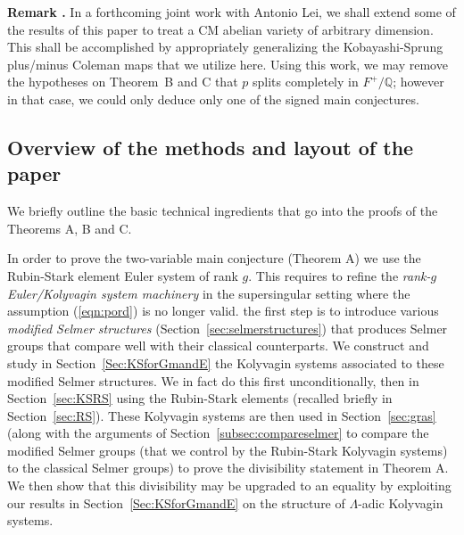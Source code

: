\documentclass[12pt]{amsart}
\numberwithin{equation}{section}
\newenvironment{rem}{\par\medskip\noindent\refstepcounter{thm}
\bgroup{\hspace*{-0.15 cm}\bf{Remark} \thethm.}\bgroup}{\egroup
\egroup\par\medskip} \parskip 2pt
\begin{document}
\begin{rem}
\label{rem:lei}
 In a forthcoming joint work with Antonio Lei, we shall extend some of the results of this paper to treat a CM abelian variety of arbitrary dimension. This shall be accomplished by appropriately generalizing the Kobayashi-Sprung plus/minus Coleman maps that we utilize here. Using this work, we may remove the hypotheses on Theorem~B and C that $p$ splits completely in $F^+/{\mathbb{Q}}$; however in that case, we could only deduce only one of the signed main conjectures.
 \end{rem} 
 \subsection*{Overview of the methods and layout of the paper}
We briefly outline the basic technical ingredients that go into the proofs of the Theorems A, B and C. 

In order to prove the two-variable main conjecture (Theorem A) we use the Rubin-Stark element Euler system of rank $g$. This requires to refine the \emph{rank-$g$ Euler/Kolyvagin system machinery} in the supersingular setting where the assumption (\ref{eqn:pord}) is no longer valid. the first step is to introduce various \emph{modified Selmer structures} (Section~\ref{sec:selmerstructures}) that produces Selmer groups that compare well with their classical counterparts. We construct and study in Section~\ref{Sec:KSforGmandE} the Kolyvagin systems associated to these modified Selmer structures. We in fact do this first unconditionally, then in Section~\ref{sec:KSRS} using the Rubin-Stark elements (recalled briefly in Section~\ref{sec:RS}). 
These Kolyvagin systems are then used in Section~\ref{sec:gras} (along with the arguments of Section~\ref{subsec:compareselmer} to compare the modified Selmer groups (that we control by the Rubin-Stark Kolyvagin systems) to the classical Selmer groups) to prove the divisibility statement in Theorem A. We then show that this divisibility may be upgraded to an equality by exploiting our results in Section~\ref{Sec:KSforGmandE} on the structure of ${\Lambda}$-adic Kolyvagin systems.
\end{document}

